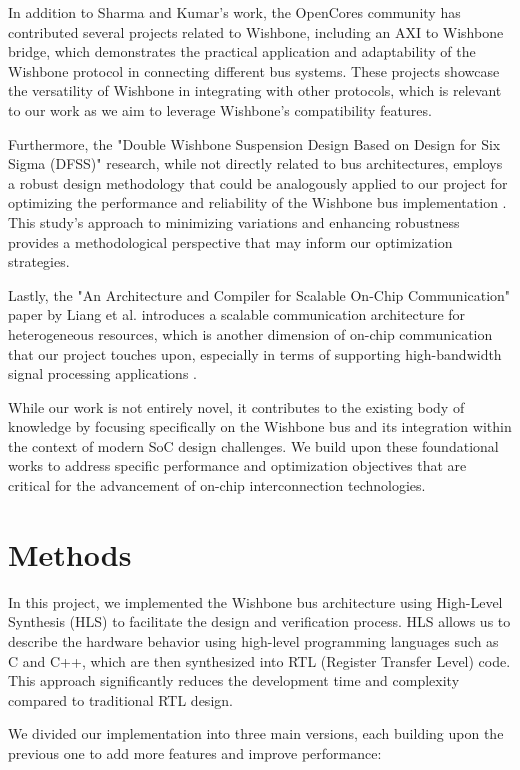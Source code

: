 \documentclass[12pt]{report}
\begin{document}
In addition to Sharma and Kumar's work, the OpenCores community has contributed several projects related to Wishbone, including an AXI to Wishbone bridge, which demonstrates the practical application and adaptability of the Wishbone protocol in connecting different bus systems.\cite{opencores_wishbone} These projects showcase the versatility of Wishbone in integrating with other protocols, which is relevant to our work as we aim to leverage Wishbone's compatibility features.

Furthermore, the "Double Wishbone Suspension Design Based on Design for Six Sigma (DFSS)" research, while not directly related to bus architectures, employs a robust design methodology that could be analogously applied to our project for optimizing the performance and reliability of the Wishbone bus implementation . This study's approach to minimizing variations and enhancing robustness provides a methodological perspective that may inform our optimization strategies.

Lastly, the "An Architecture and Compiler for Scalable On-Chip Communication" paper by Liang et al. introduces a scalable communication architecture for heterogeneous resources, which is another dimension of on-chip communication that our project touches upon, especially in terms of supporting high-bandwidth signal processing applications .

While our work is not entirely novel, it contributes to the existing body of knowledge by focusing specifically on the Wishbone bus and its integration within the context of modern SoC design challenges. We build upon these foundational works to address specific performance and optimization objectives that are critical for the advancement of on-chip interconnection technologies.



\section{Methods}

In this project, we implemented the Wishbone bus architecture using High-Level Synthesis (HLS) to facilitate the design and verification process. HLS allows us to describe the hardware behavior using high-level programming languages such as C and C++, which are then synthesized into RTL (Register Transfer Level) code. This approach significantly reduces the development time and complexity compared to traditional RTL design.

We divided our implementation into three main versions, each building upon the previous one to add more features and improve performance:
\end{document}
